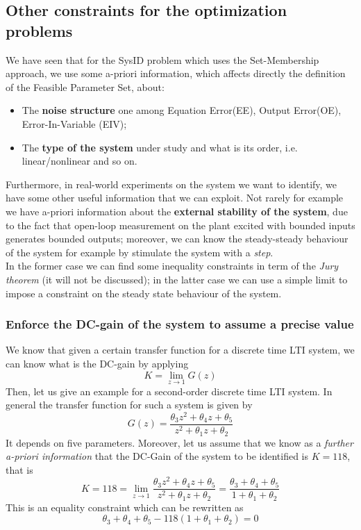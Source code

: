 \subsection{Other constraints for the optimization problems}
We have seen that for the SysID problem which uses the Set-Membership approach, we use some a-priori information, which affects directly the definition of the Feasible Parameter Set, about:
\begin{itemize}
    \itemsep0em
    \item The \textbf{noise structure} one among Equation Error(EE), Output Error(OE), Error-In-Variable (EIV); 
    \item The \textbf{type of the system} under study and what is its order, i.e. linear/nonlinear and so on.
\end{itemize} 
Furthermore, in real-world experiments on the system we want to identify, we have some other useful information that we can exploit. Not rarely for example we have a-priori information about the \textbf{external stability of the system}, due to the fact that open-loop measurement on the plant excited with bounded inputs generates bounded outputs; moreover, we can know the steady-steady behaviour of the system for example by stimulate the system with a \textit{step}. \\In the former case we can find some inequality constraints in term of the \textit{Jury theorem} (it will not be discussed); in the latter case we can use a simple limit to impose a constraint on the steady state behaviour of the system. 

\subsubsection{Enforce the DC-gain of the system to assume a precise value}
We know that given a certain transfer function for a discrete time LTI system, we can know what is the DC-gain by applying 
\begin{equation*}
    K = \lim_{z\to 1} G(z) 
\end{equation*}
Then, let us give an example for a second-order discrete time LTI system. In general the transfer function for such a system is given by
\begin{equation*}
    G(z) = \frac{
        \theta_3 z^2 + \theta_4 z + \theta_5
    }{
        z^2 + \theta_1 z + \theta_2
    }
\end{equation*}
It depends on five parameters. Moreover, let us assume that we know as a \textit{further a-priori information} that the DC-Gain of the system to be identified is $K=118$, that is
\begin{equation*}
    K = 118 = \lim_{z \to 1}  \frac{
        \theta_3 z^2 + \theta_4 z + \theta_5
    }{
        z^2 + \theta_1 z + \theta_2
    } = \frac{
        \theta_3+ \theta_4  + \theta_5
    }{
        1+ \theta_1  + \theta_2
    }
\end{equation*}
This is an equality constraint which can be rewritten as 
{\large{
    \begin{equation*}
        \theta_3 + \theta_4 + \theta_5 -118(1+\theta_1+\theta_2) =0
    \end{equation*}
}}

